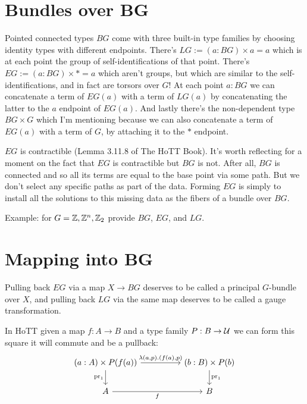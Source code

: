 \documentclass[12pt]{extarticle}
\begin{document}
\section{Bundles over BG}
Pointed connected types $BG$ come with three built-in type families by choosing identity types with different endpoints. There's $LG:=(a:BG)\times a=a$ which is at each point the group of self-identifications of that point. There's $EG:=(a:BG)\times *=a$ which aren't groups, but which are similar to the self-identifications, and in fact are torsors over $G$! At each point $a:BG$ we can concatenate a term of $EG(a)$ with a term of $LG(a)$ by concatenating the latter to the $a$ endpoint of $EG(a)$. And lastly there's the non-dependent type $BG\times G$ which I'm mentioning because we can also concatenate a term of $EG(a)$ with a term of $G$, by attaching it to the $*$ endpoint.

$EG$ is contractible (Lemma 3.11.8 of The HoTT Book\cite{hottbook}). It's worth reflecting for a moment on the fact that $EG$ is contractible but $BG$ is not. After all, $BG$ is connected and so all its terms are equal to the base point via some path. But we don't select any specific paths as part of the data. Forming $EG$ is simply to install all the solutions to this missing data as the fibers of a bundle over $BG$.

Example: for $G=\mathbb{Z}, \mathbb{Z}^n, \mathbb{Z}_2$ provide $BG$, $EG$, and $LG$.

\section{Mapping into BG}
Pulling back $EG$ via a map $X\to BG$ deserves to be called a principal $G$-bundle over $X$, and pulling back $LG$ via the same map deserves to be called a gauge transformation.

In HoTT given a map $f:A\to B$ and a type family $P:B\to \mathcal{U}$ we can form this square it will commute and be a pullback:
\[\begin{tikzcd}
	{(a:A)\times P(f(a))} && {(b:B)\times P(b)} \\
	A && B
	\arrow["{\mathrm{pr}_1}", from=1-3, to=2-3]
	\arrow["{\lambda(a, p).(f(a),p)}", from=1-1, to=1-3]
	\arrow["f"', from=2-1, to=2-3]
	\arrow["{\mathrm{pr}_1}"', from=1-1, to=2-1]
\end{tikzcd}\]
\end{document}

